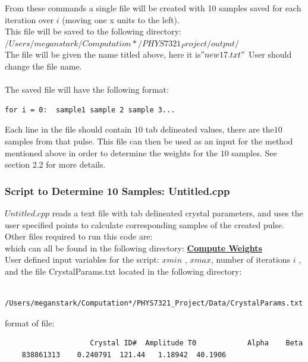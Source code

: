 \documentclass{article}
\begin{document}
From these commands a single file will be created with 10 samples saved for each iteration over $i$ (moving one x units to the left). \\ This file will be saved to the following directory: $/Users/meganstark/Computation*/PHYS7321_Project/output/$ %
\\ The file will be given the name titled above, here it is$ "new17.txt"$ User should change the file name. \\
\\ The saved file will have the following format:
\begin{verbatim} 
for i = 0:  sample1 sample 2 sample 3...
\end{verbatim}
Each line in the file should contain $10$ tab delineated values, there are the$ 10$ samples from that pulse.
This file can then be used as an input for the method mentioned above in order to determine the weights for the $10$ samples. See section 2.2 for more details. %




\subsubsection{Script to Determine 10 Samples: Untitled.cpp} 

$Untitled.cpp$ reads a text file with tab delineated crystal parameters, and uses the user specified points to calculate corresponding samples of the created pulse. 
Other files required to run this code are:
\\
 which can all be found in the following directory:
\href{https://github.com/atishelmanch/ECAL_Weights/tree/Megan/src/ComputeWeights}{\bf{Compute Weights}}
\\

User defined input variables for the script: $xmin$ , $xmax$, number of iterations $i$ , and the file CrystalParams.txt located in the following directory:
	\begin{verbatim} /Users/meganstark/Computation*/PHYS7321_Project/Data/CrystalParams.txt \end{verbatim} 
		format of file: 
		\begin{verbatim} 
					Crystal ID#  Amplitude T0 		     Alpha    Beta 
	838861313    0.240791  121.44   1.18942  40.1906
		\end{verbatim}
\end{document}
